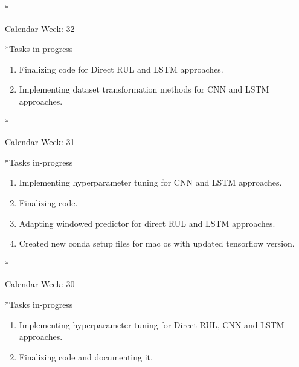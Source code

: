 \documentclass[11pt,a4paper]{article}
\begin{document}
\newpage
\begin{section}*{Calendar Week: 32  \hfill \date{13 August, 2021}}
 \begin{refsection}
     \begin{subsection}*{Tasks in-progress}
         \begin{enumerate}
             \item Finalizing code for Direct RUL and LSTM approaches.
             \item Implementing dataset transformation methods for CNN and LSTM approaches.
         \end{enumerate}
     \end{subsection}
 \end{refsection}
\end{section}
\newpage
\begin{section}*{Calendar Week: 31  \hfill \date{06 August, 2021}}
 \begin{refsection}
     \begin{subsection}*{Tasks in-progress}
         \begin{enumerate}
             \item Implementing hyperparameter tuning for CNN and LSTM approaches.
             \item Finalizing code.
             \item Adapting windowed predictor for direct RUL and LSTM approaches.
             \item Created new conda setup files for mac os with updated tensorflow version.
         \end{enumerate}
     \end{subsection}
 \end{refsection}
\end{section}
\newpage
\begin{section}*{Calendar Week: 30  \hfill \date{30 July, 2021}}
 \begin{refsection}
     \begin{subsection}*{Tasks in-progress}
         \begin{enumerate}
             \item Implementing hyperparameter tuning for Direct RUL, CNN and LSTM approaches.
             \item Finalizing code and documenting it.
         \end{enumerate}
     \end{subsection}
 \end{refsection}
\end{section}
\end{document}
